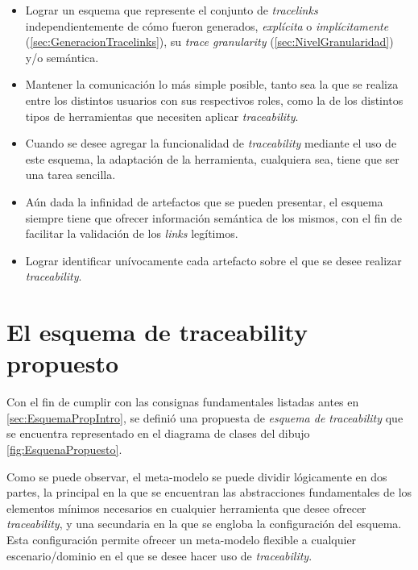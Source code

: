 \documentclass[a4paper,12pt,oneside,spanish]{book}
\begin{document}
\begin{itemize}

\item Lograr un esquema que represente el conjunto de \textit{tracelinks} independientemente de cómo fueron generados, \textit{explícita} o \textit{implícitamente} (\ref{sec:GeneracionTracelinks}), su \textit{trace granularity} (\ref{sec:NivelGranularidad}) y/o semántica.

\item Mantener la comunicación lo más simple posible, tanto sea la que se realiza entre los distintos usuarios con sus respectivos roles, como la de los distintos tipos de herramientas que necesiten aplicar \textit{traceability}.

\item Cuando se desee agregar la funcionalidad de \textit{traceability} mediante el uso de este esquema, la adaptación de la herramienta, cualquiera sea, tiene que ser una tarea sencilla.

\item Aún dada la infinidad de artefactos que se pueden presentar, el esquema siempre tiene que ofrecer información semántica de los mismos, con el fin de facilitar la validación de los \textit{links} legítimos.

\item Lograr identificar unívocamente cada artefacto sobre el que se desee realizar \textit{traceability}.

\end{itemize}

\section{El esquema de traceability propuesto}
\label{sec:EsquemaTraceability}

Con el fin de cumplir con las consignas fundamentales listadas antes en \ref{sec:EsquemaPropIntro}, se definió una propuesta de \textit{esquema de traceability} que se encuentra representado en el diagrama de clases del dibujo \ref{fig:EsquenaPropuesto}.

Como se puede observar, el meta-modelo se puede dividir lógicamente en dos partes, la principal en la que se encuentran las abstracciones fundamentales de los elementos mínimos necesarios en cualquier herramienta que desee ofrecer \textit{traceability}, y una secundaria en la que se engloba la configuración del esquema. Esta configuración permite ofrecer un meta-modelo flexible a cualquier escenario/dominio en el que se desee hacer uso de \textit{traceability}.
\end{document}
